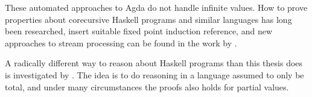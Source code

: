 These automated approaches to Agda do not handle infinite values. How
to prove properties about corecursive Haskell programs and similar
languages has long been researched, insert suitable fixed point
induction reference, and new approaches to stream processing can be
found in the work by \cite{streams}.

A radically different way to reason about Haskell programs than this
thesis does is investigated by \cite{fastandloose}. The idea is to do
reasoning in a language assumed to only be total, and under many
circumstances the proofs also holds for partial values.
